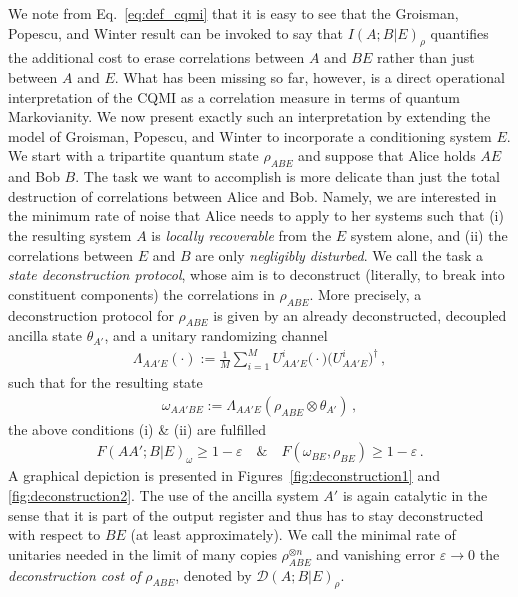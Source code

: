 \documentclass[a4paper,aps,prl,twocolumn,10pt,superscriptaddress]{revtex4-1}
\theoremstyle{plain}
\theoremstyle{definition}
\begin{document}
We note from Eq.~\eqref{eq:def_cqmi} that it is easy to see that the Groisman, Popescu, and Winter result can be invoked to say that $I(A;B|E)_{\rho}$ quantifies the additional cost to erase correlations between $A$ and $BE$ rather than just between $A$ and $E$. What has been missing so far, however, is a direct operational interpretation of the CQMI as a correlation measure in terms of quantum Markovianity. We now present exactly such an interpretation by extending the model of Groisman, Popescu, and Winter to incorporate a conditioning system $E$. We start with a tripartite quantum state $\rho_{ABE}$ and suppose that Alice holds $AE$ and Bob $B$. The task we want to accomplish is more delicate than just the total destruction of correlations between Alice and Bob. Namely, we are interested in the minimum rate of noise that Alice needs to apply to her systems such that
(i) the resulting system $A$ is \textit{locally recoverable} from the $E$ system alone, and
(ii) the correlations between $E$ and $B$ are only \textit{negligibly disturbed}.
We call the task a {\it state deconstruction protocol}, whose aim is to deconstruct (literally, to break into constituent components) the correlations in $\rho_{ABE}$. More precisely, a deconstruction protocol for $\rho_{ABE}$ is given by an already deconstructed, decoupled ancilla state $\theta_{A'}$, and a unitary randomizing channel
\begin{align}\label{eq:unital_randomizing}
\Lambda_{AA'E}(\cdot):=\frac{1}{M}\sum_{i=1}^MU^i_{AA'E}\big(\cdot\big)\big(U^i_{AA'E}\big)^\dagger \, ,
\end{align}
such that for the resulting state
\begin{align}\label{eq:omega_state}
\omega_{AA'BE}:=\Lambda_{AA'E}(\rho_{ABE}\otimes\theta_{A'})\,,
\end{align}
the above conditions (i) \& (ii) are fulfilled
\begin{align}\label{eq:conditions}
F(AA';B|E)_\omega\geq1-\varepsilon\quad\mathrm{\&}\quad F\left(\omega_{BE},\rho_{BE}\right)\geq1-\varepsilon\,.
\end{align}
A graphical depiction is presented in Figures~\ref{fig:deconstruction1} and \ref{fig:deconstruction2}.
The use of the ancilla system $A'$ is again catalytic in the sense that it is part of the output register and thus has to stay deconstructed with respect to $BE$ (at least approximately). We call the minimal rate of unitaries needed in the limit of many copies $\rho_{ABE}^{\otimes n}$ and vanishing error $\varepsilon\to0$ the {\it deconstruction cost of} $\rho_{ABE}$, denoted by $\mathcal{D}(A;B|E)_\rho$.
\end{document}
